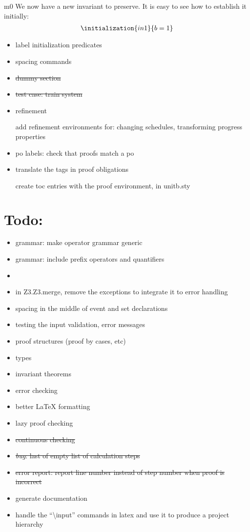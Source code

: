 \documentclass[12pt]{amsart}
\begin{document}
\begin{machine}{m0}
We now have a new invariant to preserve. It is easy to see how to establish it initially:
%
\begin{align*}
\initialization{in1}
{	b = 1	}
\end{align*}

\begin{itemize}
\item label initialization predicates
\item spacing commands
\item \sout{dummy section}
\item \sout{test case: train system}
\item refinement

	add refinement environments for: changing schedules, transforming progress properties
\item po labels: check that proofs match a po
\item translate the tags in proof obligations
	
	create toc entries with the proof environment, in unitb.sty
\end{itemize}

\section{Todo:}
\begin{itemize}
\item grammar: make operator grammar generic
\item grammar: include prefix operators and quantifiers
\item 
\item in Z3.Z3.merge, remove the exceptions to integrate it to error handling
\item spacing in the middle of event and set declarations
\item testing the input validation, error messages
\item proof structures (proof by cases, etc)
\item types
\item invariant theorems
\item error checking
\item better LaTeX formatting
\item lazy proof checking
\item \sout{continuous checking}
\item \sout{\emph{bug}: last of empty list of calculation steps}
\item \sout{error report: report line number instead of step number when proof is incorrect}
\item generate documentation
\item handle the ``\textbackslash input'' commands in latex and use it to produce a project hierarchy
\end{itemize}


\end{machine}
\end{document}
